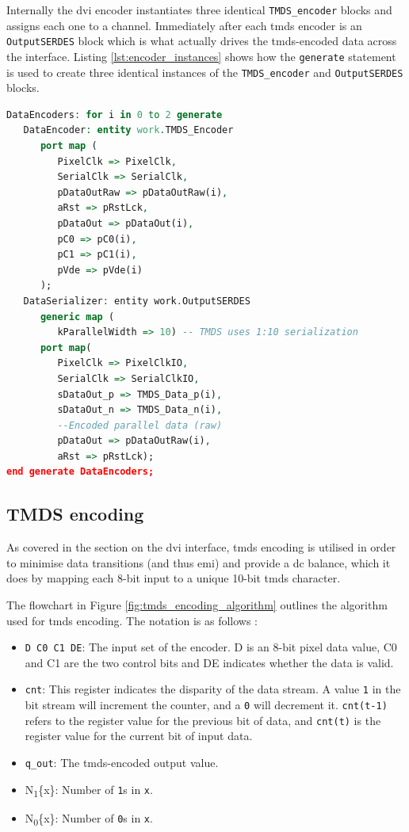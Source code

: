 Internally the \gls{dvi} encoder instantiates three identical \texttt{TMDS\_encoder} blocks and assigns each one to a channel. Immediately after each \gls{tmds} encoder is an \texttt{OutputSERDES} block which is what actually drives the \gls{tmds}-encoded data across the interface. Listing \ref{lst:encoder_instances} shows how the \texttt{generate} statement is used to create three identical instances of the \texttt{TMDS\_encoder} and \texttt{OutputSERDES} blocks.

\begin{lstlisting}[caption={Instantiatiating a TMDS encoder and serialiser for each channel.}, label={lst:encoder_instances}, language=VHDL]
DataEncoders: for i in 0 to 2 generate
   DataEncoder: entity work.TMDS_Encoder
      port map (
         PixelClk => PixelClk,
         SerialClk => SerialClk,
         pDataOutRaw => pDataOutRaw(i),
         aRst => pRstLck,
         pDataOut => pDataOut(i),
         pC0 => pC0(i),
         pC1 => pC1(i),
         pVde => pVde(i)
      );
   DataSerializer: entity work.OutputSERDES
      generic map (
         kParallelWidth => 10) -- TMDS uses 1:10 serialization
      port map(
         PixelClk => PixelClkIO,
         SerialClk => SerialClkIO,
         sDataOut_p => TMDS_Data_p(i),
         sDataOut_n => TMDS_Data_n(i),
         --Encoded parallel data (raw)
         pDataOut => pDataOutRaw(i),
         aRst => pRstLck);      
end generate DataEncoders;
\end{lstlisting} 

\subsection{TMDS encoding}
As covered in the section on the \gls{dvi} interface, \gls{tmds} encoding is utilised in order to minimise data transitions (and thus \gls{emi}) and provide a \gls{dc} balance, which it does by mapping each 8-bit input to a unique 10-bit \gls{tmds} character.

The flowchart in Figure \ref{fig:tmds_encoding_algorithm} outlines the algorithm used for \gls{tmds} encoding. The notation is as follows \cite{dvi_spec}:
\begin{itemize}
    \item \texttt{D C0 C1 DE}: The input set of the encoder. D is an 8-bit pixel data value, C0 and C1 are the two control bits and DE indicates whether the data is valid.
    \item \texttt{cnt}: This register indicates the disparity of the data stream. A value \texttt{1} in the bit stream will increment the counter, and a \texttt{0} will decrement it. \texttt{cnt(t-1)} refers to the register value for the previous bit of data, and \texttt{cnt(t)} is the register value for the current bit of input data.
    \item \texttt{q\_out}: The \gls{tmds}-encoded output value.
    \item N\textsubscript{1}\{x\}: Number of \texttt{1}s in \texttt{x}.
    \item N\textsubscript{0}\{x\}: Number of \texttt{0}s in \texttt{x}.
\end{itemize}

